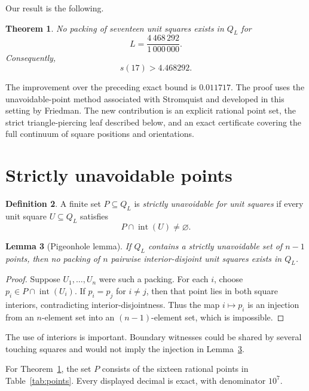 \documentclass[11pt]{article}
\newtheorem{theorem}{Theorem}
\newtheorem{lemma}[theorem]{Lemma}
\theoremstyle{definition}
\newtheorem{definition}[theorem]{Definition}
\theoremstyle{remark}
\newcommand{\Q}{Q}
\newcommand{\interior}{\operatorname{int}}
\begin{document}
Our result is the following.

\begin{theorem}\label{thm:main}
No packing of seventeen unit squares exists in $\Q_L$ for
\[
  L=\frac{4\,468\,292}{1\,000\,000}.
\]
Consequently,
\[
  s(17)>4.468292.
\]
\end{theorem}

The improvement over the preceding exact bound is $0.011717$.  The proof uses
the unavoidable-point method associated with
Stromquist and developed in this setting by Friedman\cite{Friedman2009,Stromquist2003}.
The new contribution is an explicit rational point set, the strict
triangle-piercing leaf described below, and an exact certificate covering the
full continuum of square positions and orientations.

\section{Strictly unavoidable points}

\begin{definition}
A finite set $P\subseteq \Q_L$ is \emph{strictly unavoidable for unit squares}
if every unit square $U\subseteq \Q_L$ satisfies
\[
  P\cap\interior(U)\ne\varnothing.
\]
\end{definition}

\begin{lemma}[Pigeonhole lemma]\label{lem:pigeonhole}
If $\Q_L$ contains a strictly unavoidable set of $n-1$ points, then no packing
of $n$ pairwise interior-disjoint unit squares exists in $\Q_L$.
\end{lemma}

\begin{proof}
Suppose $U_1,\dots,U_n$ were such a packing.  For each $i$, choose
$p_i\in P\cap\interior(U_i)$.  If $p_i=p_j$ for $i\ne j$, then that point lies
in both square interiors, contradicting interior-disjointness.  Thus the map
$i\mapsto p_i$ is an injection from an $n$-element set into an $(n-1)$-element
set, which is impossible.
\end{proof}

The use of interiors is important.  Boundary witnesses could be shared by
several touching squares and would not imply the injection in
Lemma~\ref{lem:pigeonhole}.

For Theorem~\ref{thm:main}, the set $P$ consists of the sixteen rational points
in Table~\ref{tab:points}.  Every displayed decimal is exact, with denominator
$10^7$.
\end{document}
